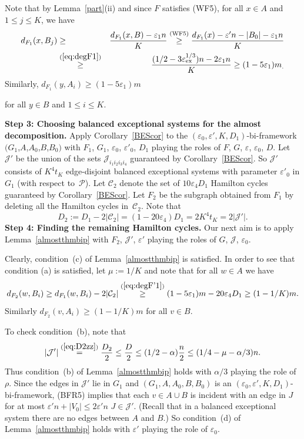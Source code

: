 \documentclass{memo-l}
\def\COMMENT#1{}
\def\cC{\mathcal{C}}
\def\eps{\varepsilon}
\def\cJ{\mathcal{J}}
\numberwithin{section}{chapter}
\numberwithin{equation}{section}
\numberwithin{firstthm}{section}
\numberwithin{figure}{section}
\begin{document}
{Note that by Lemma~\ref{part}(ii) and since $F$ satisfies (WF5),
for all $x \in A$ and $1 \leq j \leq K$, we have
\begin{eqnarray}\label{eq:degF'1}
d_{F_1}(x,B_j)& \ge & \frac{d_{F_1}(x,B) - \eps_1n}{K} \stackrel{{\rm (WF5)}}{\ge} \frac{d_{F_1}(x)-\eps' n -|B_0|- \eps_1 n}{K}\nonumber\\
& \stackrel{(\ref{eq:degF1})}{\ge} & \frac{(1/2-3\eps_{\rm ex}^{1/3})n- 2\eps_1 n}{K}
\ge (1-5\eps_1)m_.
\end{eqnarray}
Similarly, $d_{F_1}(y,A_i)\ge (1-5\eps_1)m$%
\COMMENT{Andy: deleted a prime}
for all $y\in B$ and $1 \leq i \leq K$.

\smallskip


\noindent\textbf{Step 3: Choosing balanced exceptional systems for the almost decomposition.}
Apply Corollary~\ref{BEScor} to the $(\eps_0,\eps',K,D_1)$-bi-framework $(G_1$,$A$,$A_0$,$B$,$B_0)$ with
$F_1$, $G_1$, $\eps_0$, $\eps'_0$, $D_1$ playing the roles
of $F$, $G$, $\eps$, $\eps_0$, $D$. Let $\cJ'$ be the union of the sets $\cJ_{i_1i_2i_3i_4}$ guaranteed by Corollary~\ref{BEScor}.
So $\cJ'$ consists of $K^4t_{K}$ edge-disjoint balanced exceptional systems with parameter $\eps'_0$ in $G_1$ (with respect to~$\mathcal{P}$).
Let $\cC_2$ denote the set of $10 \eps _4 D_1$ Hamilton cycles guaranteed by Corollary~\ref{BEScor}.
Let $F_2$ be the subgraph obtained from $F_1$ by deleting all the Hamilton cycles in~$\cC_2$.  
Note that 
\begin{equation}\label{eq:D2zz}
D_2:=D_1 -2|\mathcal C_2| =(1-20 \eps _4)D_1=2K^4 t_K =2|\cJ'|.
\end{equation}
\noindent\textbf{Step 4: Finding the remaining Hamilton cycles.}
Our next aim is to apply Lemma~\ref{almostthmbip} with $F_2$, $\cJ'$,  $\eps'$ playing the
roles of $G$, $\cJ$,  $\eps_0$.

Clearly, condition~(c) of Lemma~\ref{almostthmbip} is satisfied.
In order to see that condition (a) is satisfied, let $\mu:=1/K$ and note that for all $w\in A$ we have 
$$
d_{F_2}(w,B_i)\ge d_{F_1}(w,B_i)-2|\cC_2|\stackrel{(\ref{eq:degF'1})}{\ge} (1-5\eps_1)m-20\eps_4 D_1\ge (1-1/K)m.
$$
Similarly $d_{F_2}(v,A_i)\ge (1-1/K)m$ for all $v\in B$.


To check condition~(b), note that
$$|\cJ'|\stackrel{(\ref{eq:D2zz})}{=} \frac{D_2}{2}\le \frac{D}{2}\le (1/2-\alpha)\frac{n}{2}\le (1/4-\mu-\alpha/3)n .$$
Thus condition~(b) of Lemma~\ref{almostthmbip} holds with $\alpha/3$ playing the role of $\rho$.
Since the edges in $\cJ'$ lie in $G_1$ and  $(G_1,A,A_0,B,B_0)$ is an $(\eps_0,\eps',K,D_1)$-bi-framework,
(BFR5) implies that each $v \in A \cup B$ is incident with an edge in $J$ for at most $\eps ' n+|V_0|\leq 2\eps 'n$
$J \in \cJ '$. 
(Recall that in a balanced exceptional system there are no edges between $A$ and $B$.)
So condition~(d) of Lemma~\ref{almostthmbip} holds with $\eps '$ playing the role of $\eps _0$.

}
\end{document}
